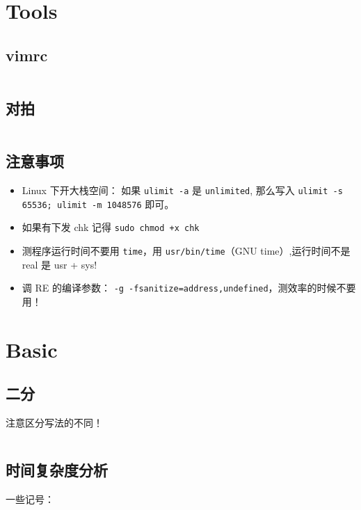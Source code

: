 \documentclass[titlepage, a4paper]{article}
\begin{document}
	\begin{multicols}{2}
		\setcounter{tocdepth}{3}
		\begingroup
		\let\cleardoublepage\relax
		\let\clearpage\relax
		\begin{small}
			\begin{spacing}{0.75}
				\tableofcontents
			\end{spacing}
		\end{small}
		\newpage
		\begin{spacing}{0.6}
			\section{Tools}
				\subsection{vimrc}
				 	\inputminted{vim}{src/Tools/.vimrc}
				 \subsection{对拍}
				 	\inputminted{sh}{src/Tools/stress.sh}
				 \subsection{注意事项}
				 	\begin{itemize}
				 		\item Linux 下开大栈空间： 如果 \texttt{ulimit -a} 是 \texttt{unlimited}, 那么写入 \texttt{ulimit -s 65536; ulimit -m 1048576} 即可。
				 		\item 如果有下发 chk 记得 \texttt{sudo chmod +x chk}
				 		\item 测程序运行时间不要用 \texttt{time}，用 \texttt{usr/bin/time}（GNU time）,运行时间不是 real 是 usr + sys!
				 		\item 调 RE 的编译参数： \texttt{-g -fsanitize=address,undefined}，测效率的时候不要用！
				 	\end{itemize}
			 \section{Basic}
			 	\subsection{二分}
			 		
			 		注意区分写法的不同！
			 	
			 		\inputminted{cpp}{src/Basic/Binary_search.cpp}
			 	\subsection{时间复杂度分析}
			 		一些记号：
			 		

\end{spacing}
\end{multicols}
\end{document}
